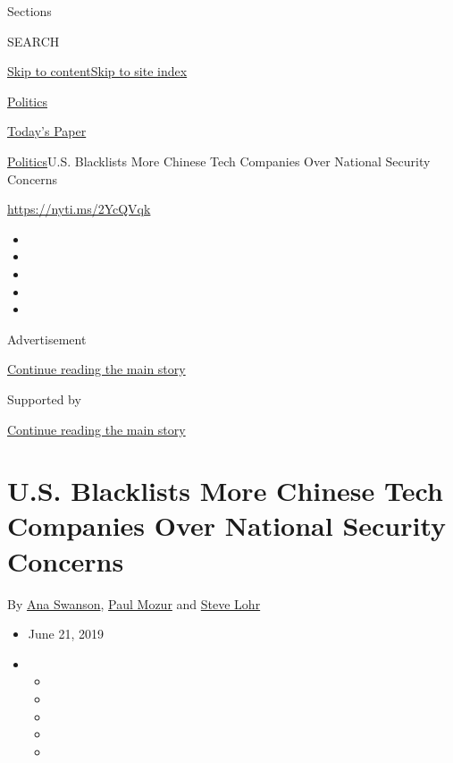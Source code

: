 Sections

SEARCH

\protect\hyperlink{site-content}{Skip to
content}\protect\hyperlink{site-index}{Skip to site index}

\href{https://www.nytimes.com/section/politics}{Politics}

\href{https://myaccount.nytimes.com/auth/login?response_type=cookie\&client_id=vi}{}

\href{https://www.nytimes.com/section/todayspaper}{Today's Paper}

\href{/section/politics}{Politics}\textbar{}U.S. Blacklists More Chinese
Tech Companies Over National Security Concerns

\url{https://nyti.ms/2YcQVqk}

\begin{itemize}
\item
\item
\item
\item
\item
\end{itemize}

Advertisement

\protect\hyperlink{after-top}{Continue reading the main story}

Supported by

\protect\hyperlink{after-sponsor}{Continue reading the main story}

\hypertarget{us-blacklists-more-chinese-tech-companies-over-national-security-concerns}{%
\section{U.S. Blacklists More Chinese Tech Companies Over National
Security
Concerns}\label{us-blacklists-more-chinese-tech-companies-over-national-security-concerns}}

By \href{https://www.nytimes.com/by/ana-swanson}{Ana Swanson},
\href{https://www.nytimes.com/by/paul-mozur}{Paul Mozur} and
\href{https://www.nytimes.com/by/steve-lohr}{Steve Lohr}

\begin{itemize}
\item
  June 21, 2019
\item
  \begin{itemize}
  \item
  \item
  \item
  \item
  \item
  \end{itemize}
\end{itemize}

